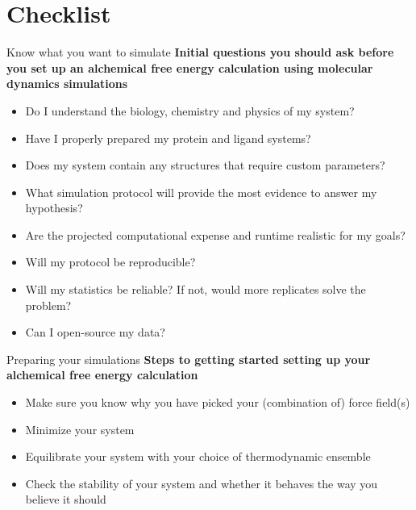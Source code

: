 \documentclass[9pt,bestpractices]{livecoms}
\begin{document}
\section{Checklist}
\label{sec:checklist}
\begin{Checklists*}
\begin{checklist}{ Know what you want to simulate}
    \textbf{Initial questions you should ask before you set up an alchemical free energy calculation using molecular dynamics simulations}
\begin{itemize}
    \item Do I understand the biology, chemistry and physics of my system?
    \item Have I properly prepared my protein and ligand systems?
    \item Does my system contain any structures that require custom parameters?
    \item What simulation protocol will provide the most evidence to answer my hypothesis?
    \item Are the projected computational expense and runtime realistic for my goals?
    \item Will my protocol be reproducible? 
    \item Will my statistics be reliable? If not, would more replicates solve the problem? 
    \item Can I open-source my data?
\end{itemize}
\end{checklist}

\begin{checklist}{Preparing your simulations}
\textbf{Steps to getting started setting up your alchemical free energy calculation}
\begin{itemize}
    \item Make sure you know why you have picked your (combination of) force field(s)
    \item Minimize your system
    \item Equilibrate your system with your choice of thermodynamic ensemble
    \item Check the stability of your system and whether it behaves the way you believe it should
\end{itemize}
\end{checklist}


\end{Checklists*}
\end{document}
